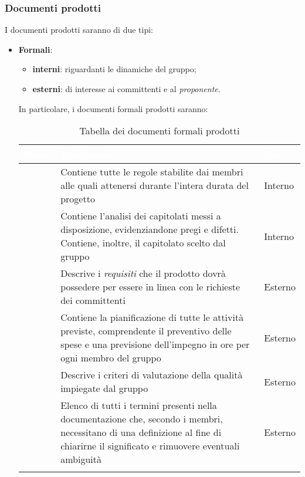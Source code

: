 	\subsubsection{Documenti prodotti}
		I documenti prodotti saranno di due tipi:
			\begin{itemize}
				\item \textbf{Formali}:
				\begin{itemize}
					\item \textbf{interni}: riguardanti le dinamiche del gruppo;
					\item \textbf{esterni}: di interesse ai committenti e al \emph{proponente}.
				\end{itemize} 
				In particolare, i documenti formali prodotti saranno:
				
				{
				\setlength{\freewidth}{\dimexpr\textwidth-1\tabcolsep}
				\renewcommand{\arraystretch}{1.5}
				\centering
				\setlength{\aboverulesep}{0pt}
				\setlength{\belowrulesep}{0pt}
				\begin{longtable}{C{.24\freewidth} C{.58\freewidth} C{.12\freewidth}}
					\toprule
					\textcolor{white}{\textbf{Nome}}&
					\textcolor{white}{\textbf{Descrizione}}&
					\textcolor{white}{\textbf{Uso}}\\	
					\toprule
					\endhead
					\NdP{} & Contiene tutte le regole stabilite dai membri alle quali attenersi durante l'intera durata del progetto & Interno \\	
					\VdC{} & Contiene l'analisi dei capitolati messi a disposizione, evidenziandone pregi e difetti. Contiene, inoltre, il capitolato scelto dal gruppo & Interno \\
					\AdR{} & Descrive i \emph{requisiti} che il prodotto dovrà possedere per essere in linea con le richieste dei committenti & Esterno \\
					\PdP{} & Contiene la pianificazione di tutte le attività previste, comprendente il preventivo delle spese e una previsione dell'impegno in ore per ogni membro del gruppo & Esterno \\
					\PdQ{} & Descrive i criteri di valutazione della qualità impiegate dal gruppo & Esterno \\
					\Glo{} & Elenco di tutti i termini presenti nella documentazione che, secondo i membri, necessitano di una definizione al fine di chiarirne il significato e rimuovere eventuali ambiguità & Esterno \\
					\bottomrule
					\caption{Tabella dei documenti formali prodotti}

\end{longtable}}
\end{itemize}
